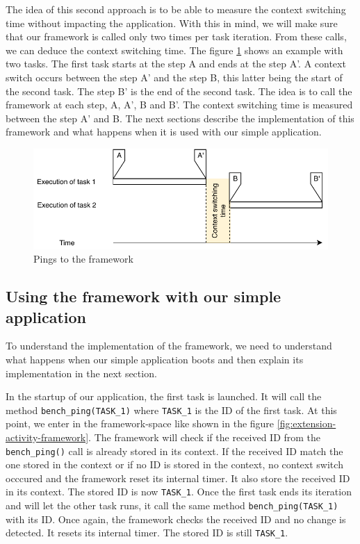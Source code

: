 The idea of this second approach is to be able to measure the context switching time without impacting the application.
With this in mind, we will make sure that our framework is called only two times per task iteration.
From these calls, we can deduce the context switching time.
The figure \ref{fig:internal-framework-ping} shows an example with two tasks.
The first task starts at the step A and ends at the step A'.
A context switch occurs between the step A' and the step B, this latter being the start of the second task.
The step B' is the end of the second task.
The idea is to call the framework at each step, A, A', B and B'.
The context switching time is measured between the step A' and B.
The next sections describe the implementation of this framework and what happens when it is used with our simple application.

\begin{figure}[!ht]
  \centering
  \includegraphics[scale=1]{assets/internal-framework-ping.pdf}
  \caption{\label{fig:internal-framework-ping}Pings to the framework}
\end{figure}

\subsection{Using the framework with our simple application}

To understand the implementation of the framework, we need to understand what happens when our simple application boots 
  and then explain its implementation in the next section.

In the startup of our application, the first task is launched.
It will call the method \texttt{bench\_ping(TASK\_1)} where \texttt{TASK\_1} is the ID of the first task.
At this point, we enter in the framework-space like shown in the figure \ref{fig:extension-activity-framework}.
The framework will check if the received ID from the \texttt{bench\_ping()} call is already stored in its context.
If the received ID match the one stored in the context or if no ID is stored in the context, no context switch occcured and the framework reset its internal timer.
It also store the received ID in its context.
The stored ID is now \texttt{TASK\_1}.
Once the first task ends its iteration and will let the other task runs, it call the same method \texttt{bench\_ping(TASK\_1)} with its ID.
Once again, the framework checks the received ID and no change is detected.
It resets its internal timer.
The stored ID is still \texttt{TASK\_1}.

